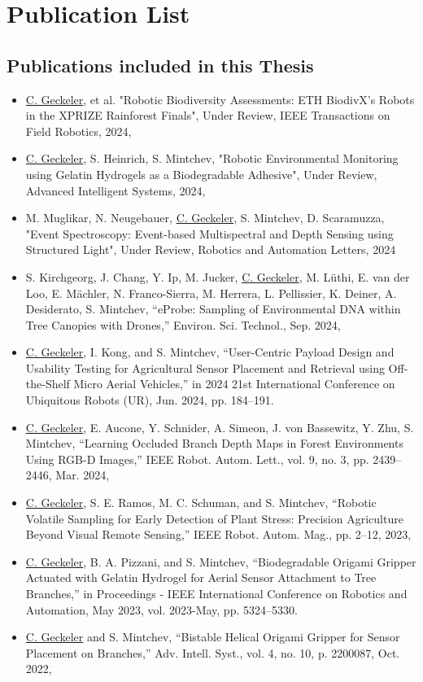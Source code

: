 \chapter{Publication List}
\label{ch:publication-list}

\section{Publications included in this Thesis}


\begin{itemize}
    \item \underline{C. Geckeler}, et al. "Robotic Biodiversity Assessments: ETH BiodivX's Robots in the XPRIZE Rainforest Finals", Under Review, IEEE Transactions on Field Robotics, 2024,
    \item \underline{C. Geckeler}, S. Heinrich, S. Mintchev, "Robotic Environmental Monitoring using Gelatin Hydrogels as a Biodegradable Adhesive", Under Review, Advanced Intelligent Systems, 2024,
    \item M. Muglikar, N. Neugebauer, \underline{C. Geckeler}, S. Mintchev, D. Scaramuzza, "Event Spectroscopy: Event-based Multispectral and Depth Sensing using Structured Light", Under Review, Robotics and Automation Letters, 2024
    \item \cite{Kirchgeorg2024} S. Kirchgeorg, J. Chang, Y. Ip, M. Jucker, \underline{C. Geckeler}, M. Lüthi, E. van der Loo, E. Mächler, N. Franco-Sierra, M. Herrera, L. Pellissier, K. Deiner, A. Desiderato, S. Mintchev, “eProbe: Sampling of Environmental DNA within Tree Canopies with Drones,” Environ. Sci. Technol., Sep. 2024,
    \item \cite{Geckeler2024a} \underline{C. Geckeler}, I. Kong, and S. Mintchev, “User-Centric Payload Design and Usability Testing for Agricultural Sensor Placement and Retrieval using Off-the-Shelf Micro Aerial Vehicles,” in 2024 21st International Conference on Ubiquitous Robots (UR), Jun. 2024, pp. 184–191.
    \item \cite{Geckeler2024} \underline{C. Geckeler}, E. Aucone, Y. Schnider, A. Simeon, J. von Bassewitz, Y. Zhu, S. Mintchev, “Learning Occluded Branch Depth Maps in Forest Environments Using RGB-D Images,” IEEE Robot. Autom. Lett., vol. 9, no. 3, pp. 2439–2446, Mar. 2024,
    \item \cite{Geckeler2023a} \underline{C. Geckeler}, S. E. Ramos, M. C. Schuman, and S. Mintchev, “Robotic Volatile Sampling for Early Detection of Plant Stress: Precision Agriculture Beyond Visual Remote Sensing,” IEEE Robot. Autom. Mag., pp. 2–12, 2023,
    \item \cite{Geckeler2023b} \underline{C. Geckeler}, B. A. Pizzani, and S. Mintchev, “Biodegradable Origami Gripper Actuated with Gelatin Hydrogel for Aerial Sensor Attachment to Tree Branches,” in Proceedings - IEEE International Conference on Robotics and Automation, May 2023, vol. 2023-May, pp. 5324–5330.
    \item \cite{Geckeler2022a} \underline{C. Geckeler} and S. Mintchev, “Bistable Helical Origami Gripper for Sensor Placement on Branches,” Adv. Intell. Syst., vol. 4, no. 10, p. 2200087, Oct. 2022,    
\end{itemize}

